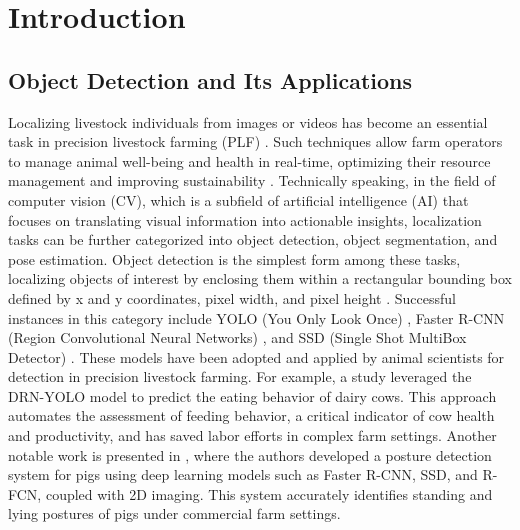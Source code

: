 \section{Introduction}

\subsection*{Object Detection and Its Applications}

Localizing livestock individuals from images or videos has become an essential task in precision livestock farming (PLF) \cite{fernandes2020image}. Such techniques allow farm operators to manage animal well-being and health in real-time, optimizing their resource management and improving sustainability \cite{morrone2022industry, hao2023cattle}. Technically speaking, in the field of computer vision (CV), which is a subfield of artificial intelligence (AI) that focuses on translating visual information into actionable insights, localization tasks can be further categorized into object detection, object segmentation, and pose estimation. Object detection is the simplest form among these tasks, localizing objects of interest by enclosing them within a rectangular bounding box defined by x and y coordinates, pixel width, and pixel height \cite{viola2001rapid}. Successful instances in this category include YOLO (You Only Look Once) \cite{redmon2016you}, Faster R-CNN (Region Convolutional Neural Networks) \cite{girshick2015fast}, and SSD (Single Shot MultiBox Detector) \cite{liu2016ssd}. These models have been adopted and applied by animal scientists for detection in precision livestock farming. For example, a study \cite{yu2022automatic} leveraged the DRN-YOLO model \cite{xu2020improved} to predict the eating behavior of dairy cows. This approach automates the assessment of feeding behavior, a critical indicator of cow health and productivity, and has saved labor efforts in complex farm settings. Another notable work is presented in \cite{nasirahmadi2019deep}, where the authors developed a posture detection system for pigs using deep learning models such as Faster R-CNN, SSD, and R-FCN, coupled with 2D imaging. This system accurately identifies standing and lying postures of pigs under commercial farm settings.

